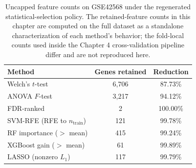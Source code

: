 \begin{table}[H]
\centering
\caption{Uncapped feature counts on GSE42568 under the regenerated statistical-selection policy. The retained-feature counts in this chapter are computed on the full dataset as a standalone characterization of each method's behavior; the fold-local counts used inside the Chapter 4 cross-validation pipeline differ and are not reproduced here.}
\label{tab:gse42568_probes}
\small
\begin{tabular}{lcc}
\toprule
\textbf{Method} & \textbf{Genes retained} & \textbf{Reduction} \\
\midrule
Welch's $t$-test & 6,706 & 87.73\% \\
ANOVA $F$-test & 3,217 & 94.12\% \\
FDR-ranked & 2 & 100.00\% \\
SVM-RFE (RFE to $n_{\mathrm{train}}$) & 121 & 99.78\% \\
RF importance ($>$ mean) & 415 & 99.24\% \\
XGBoost gain ($>$ mean) & 61 & 99.89\% \\
LASSO (nonzero $L_1$) & 117 & 99.79\% \\
\bottomrule
\end{tabular}
\end{table}

\iffalse

